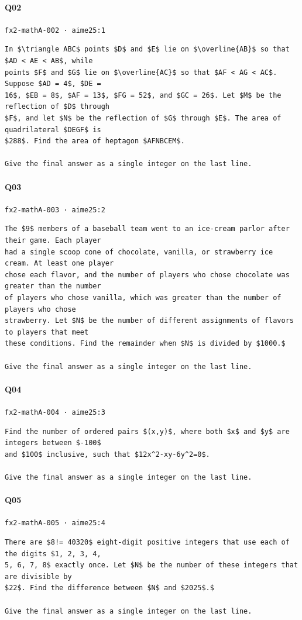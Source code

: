 \documentclass[10pt]{article}
\begin{document}
\paragraph{Q02} \texttt{fx2-mathA-002  ·  aime25:1}
\begin{verbatim}
In $\triangle ABC$ points $D$ and $E$ lie on $\overline{AB}$ so that $AD < AE < AB$, while
points $F$ and $G$ lie on $\overline{AC}$ so that $AF < AG < AC$. Suppose $AD = 4$, $DE =
16$, $EB = 8$, $AF = 13$, $FG = 52$, and $GC = 26$. Let $M$ be the reflection of $D$ through
$F$, and let $N$ be the reflection of $G$ through $E$. The area of quadrilateral $DEGF$ is
$288$. Find the area of heptagon $AFNBCEM$.

Give the final answer as a single integer on the last line.
\end{verbatim}
\paragraph{Q03} \texttt{fx2-mathA-003  ·  aime25:2}
\begin{verbatim}
The $9$ members of a baseball team went to an ice-cream parlor after their game. Each player
had a single scoop cone of chocolate, vanilla, or strawberry ice cream. At least one player
chose each flavor, and the number of players who chose chocolate was greater than the number
of players who chose vanilla, which was greater than the number of players who chose
strawberry. Let $N$ be the number of different assignments of flavors to players that meet
these conditions. Find the remainder when $N$ is divided by $1000.$

Give the final answer as a single integer on the last line.
\end{verbatim}
\paragraph{Q04} \texttt{fx2-mathA-004  ·  aime25:3}
\begin{verbatim}
Find the number of ordered pairs $(x,y)$, where both $x$ and $y$ are integers between $-100$
and $100$ inclusive, such that $12x^2-xy-6y^2=0$.

Give the final answer as a single integer on the last line.
\end{verbatim}
\paragraph{Q05} \texttt{fx2-mathA-005  ·  aime25:4}
\begin{verbatim}
There are $8!= 40320$ eight-digit positive integers that use each of the digits $1, 2, 3, 4,
5, 6, 7, 8$ exactly once. Let $N$ be the number of these integers that are divisible by
$22$. Find the difference between $N$ and $2025$.$

Give the final answer as a single integer on the last line.
\end{verbatim}
\end{document}
